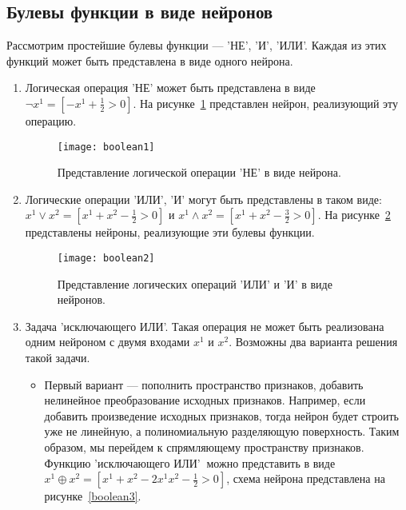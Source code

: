 \documentclass{article}
\begin{document}
	\subsection{Булевы функции в виде нейронов}
	
	Рассмотрим простейшие булевы функции --- 'НЕ', 'И', 'ИЛИ'. Каждая из этих функций может быть представлена в виде одного нейрона. 
	
	\begin{enumerate}
		\item Логическая операция 'НЕ' может быть представлена в виде $\lnot x^1 = [-x^1+\frac{1}{2}>0]$. На рисунке~\ref{boolean1} представлен нейрон, реализующий эту операцию.
		
		\begin{figure}[H]
			\begin{center}
				\begin{minipage}{0.5\linewidth}
					\texttt{[image: boolean1]}
					\caption{Представление логической операции 'НЕ' в виде нейрона.}
					\label{boolean1}
				\end{minipage}
			\end{center}
		\end{figure}
	
		\item Логические операции 'ИЛИ', 'И' могут быть представлены в таком виде: $x^1 \lor x^2 = [x^1+x^2 -\frac{1}{2}>0]$ и $x^1 \wedge x^2 = [x^1+x^2 -\frac{3}{2}>0]$. На рисунке~\ref{boolean2} представлены нейроны, реализующие эти булевы функции.
		
		\begin{figure}[H]
			\begin{center}
				\begin{minipage}{0.85\linewidth}
					\texttt{[image: boolean2]}
					\caption{Представление логических операций 'ИЛИ' и 'И' в виде нейронов.}
					\label{boolean2}
				\end{minipage}
			\end{center}
		\end{figure}
		
		\item Задача 'исключающего ИЛИ'. Такая операция не может быть реализована одним нейроном с двумя входами $x^1$ и $x^2$. Возможны два варианта решения такой задачи. 
		
		\begin{itemize}
			\item  Первый вариант --- пополнить пространство признаков, добавить нелинейное преобразование исходных признаков. Например, если добавить произведение исходных признаков, тогда нейрон будет строить уже не линейную, а полиномиальную разделяющую поверхность. Таким образом, мы перейдем к спрямляющему пространству признаков. Функцию 'исключающего ИЛИ'$~$ можно представить в виде $x^1 \oplus x^2 = [x^1+x^2 -2x^1x^2-\frac{1}{2}>0]$, схема нейрона представлена на рисунке~\ref{boolean3}.
			

\end{itemize}
\end{enumerate}
\end{document}
